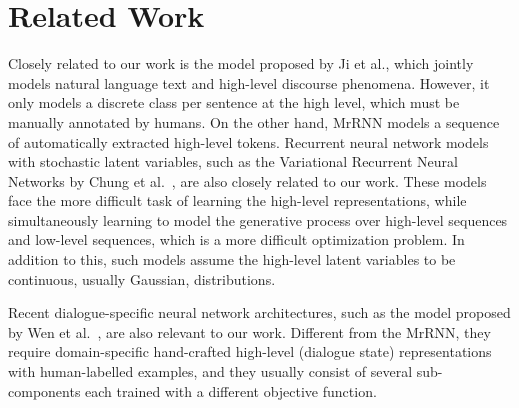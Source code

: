 \documentclass{article}
\begin{document}
 
\section{Related Work}
Closely related to our work is the model proposed by Ji et al.\cite{ji2016latent},
which jointly models natural language text and high-level discourse phenomena.
However, it only models a discrete class per sentence at the high level, which must be manually annotated by humans.
On the other hand, MrRNN models a sequence of automatically extracted high-level tokens.
Recurrent neural network models with stochastic latent variables, such as the Variational Recurrent Neural Networks by Chung et al.~\cite{chung2015recurrent}, are also closely related to our work.
These models face the more difficult task of learning the high-level representations,
while simultaneously learning to model the generative process over high-level sequences and low-level sequences,
which is a more difficult optimization problem.
In addition to this, such models assume the high-level latent variables to be continuous, usually Gaussian, distributions.

Recent dialogue-specific neural network architectures, such as the model proposed by Wen et al.~\cite{wen2016network}, are also relevant to our work.
Different from the MrRNN, they require domain-specific hand-crafted high-level (dialogue state) representations with human-labelled examples, and they usually consist of several sub-components each trained with a different objective function.



 
\end{document}
